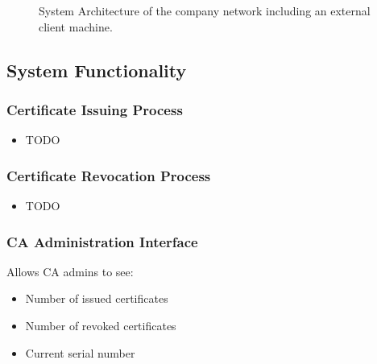 \documentclass[english]{article}
\begin{document}
\begin{figure}[htb!]
\caption{System Architecture of the company network including an external client machine.}
\centering
\label{fig:system_arch}
\end{figure}


\subsection{System Functionality}


\subsubsection{Certificate Issuing Process}
\begin{itemize}
\item TODO
\end{itemize}

\subsubsection{Certificate Revocation Process}
\begin{itemize}
\item TODO
\end{itemize}

\subsubsection{CA Administration Interface}
Allows CA admins to see:
\begin{itemize}
\item Number of issued certificates
\item Number of revoked certificates
\item Current serial number
\end{itemize}
\end{document}
